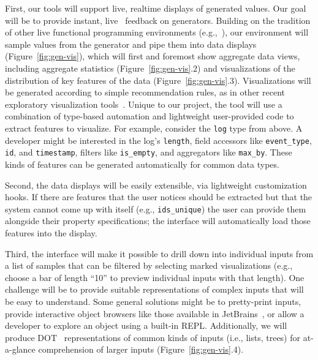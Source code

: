 First, our tools will support live, realtime displays of generated values.
Our goal will be to provide
instant, live~\cite{ref:tanimoto1990viva} feedback on generators. Building
on the tradition of other live functional programming environments
(e.g.,~\cite{tool:lighttable,ref:omar2019live}),
our environment will sample values
from the generator and
pipe them into data displays (Figure~\ref{fig:gen-vis}), which
will first and foremost show aggregate data views, including aggregate
statistics (Figure~\ref{fig:gen-vis}.2) and visualizations of the distribution
of key features of the data (Figure~\ref{fig:gen-vis}.3). Visualizations will be
generated according to simple recommendation rules, as in other recent
exploratory visualization
tools~\cite{ref:lee2021lux,wongsuphasawat_voyager_2016,
wongsuphasawat_voyager_2017}. Unique to our project, the tool will use a
combination of type-based automation and
lightweight user-provided code to extract features to visualize.
For example, consider the
\lstinline{log} type
from above. A developer might be interested in the log's
\lstinline{length}, field accessors like \lstinline{event_type}, \lstinline{id},
and \lstinline{timestamp}, filters like \lstinline{is_empty}, and
aggregators like \lstinline{max_by}. These kinds of features can be
generated automatically for common data types.

Second, the data displays will be easily extensible, via lightweight customization hooks. If
there are features that the user notices should be extracted but that the
system cannot come up with itself (e.g., \lstinline{ids_unique}) the user can
provide them alongside their property specifications;
the interface will automatically load those features into the
display.

Third, the interface will make it possible to drill down into
individual inputs from a list of samples that can be
filtered by selecting marked visualizations (e.g., choose a bar
of length ``10'' to preview individual inputs with that length). One
challenge will be to provide suitable representations of complex inputs that
will be easy to understand. Some general solutions might be to
pretty-print inputs, provide interactive object browsers like those available
in JetBrains~\cite{tool:jetbrains}, or allow a developer to explore an
object using a built-in REPL. Additionally, we will produce
DOT~\cite{ellson_graphviz_2002} representations of common kinds of
inputs (i.e., lists, trees) for at-a-glance comprehension of
larger inputs (Figure~\ref{fig:gen-vis}.4).


